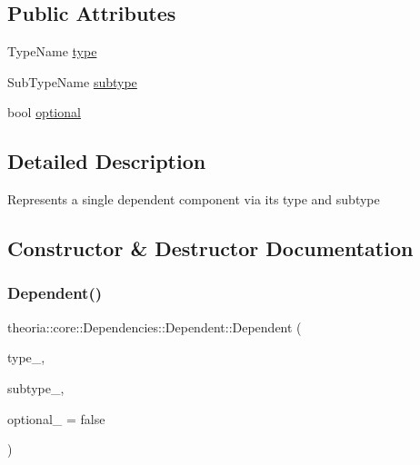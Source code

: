 \subsection*{Public Attributes}
\begin{DoxyCompactItemize}
\item 
Type\+Name \hyperlink{structtheoria_1_1core_1_1Dependencies_1_1Dependent_a9a4198c7cffacace0d8971a6ae5536b3}{type}
\item 
Sub\+Type\+Name \hyperlink{structtheoria_1_1core_1_1Dependencies_1_1Dependent_a2748915ec9980f392a2092b4bc1c3a1a}{subtype}
\item 
bool \hyperlink{structtheoria_1_1core_1_1Dependencies_1_1Dependent_a81f5f761e3b6b5db488126b909d60601}{optional}
\end{DoxyCompactItemize}


\subsection{Detailed Description}
Represents a single dependent component via it\textquotesingle{}s type and subtype 

\subsection{Constructor \& Destructor Documentation}
\mbox{\label{structtheoria_1_1core_1_1Dependencies_1_1Dependent_a25a03961885377f8d61f235968de9d7a}} 
\subsubsection{\texorpdfstring{Dependent()}{Dependent()}\hspace{0.1cm}{\footnotesize\ttfamily [1/2]}}
{\footnotesize\ttfamily theoria\+::core\+::\+Dependencies\+::\+Dependent\+::\+Dependent (\begin{DoxyParamCaption}\item[{const Type\+Name \&}]{type\+\_\+,  }\item[{const Sub\+Type\+Name \&}]{subtype\+\_\+,  }\item[{int}]{optional\+\_\+ = {\ttfamily false} }\end{DoxyParamCaption})\hspace{0.3cm}{\ttfamily [inline]}}

